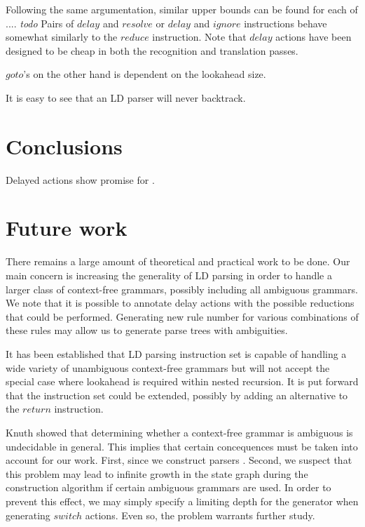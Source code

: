 \documentclass[a4paper,11pt]{article}
\begin{document}
Following the same argumentation, similar upper bounds can be found for each of .... \emph{todo}
Pairs of $delay$ and $resolve$ or $delay$ and $ignore$ instructions behave somewhat similarly to the $reduce$ instruction. 
Note that $delay$ actions have been designed to be cheap in both the recognition and translation passes. 

$goto$'s on the other hand is dependent on the lookahead size.


It is easy to see that an LD parser will never backtrack.


\section*{Conclusions}

Delayed actions show promise for .

\section*{Future work}

There remains a large amount of theoretical and practical work to be done.
Our main concern is increasing the generality of LD parsing in order to handle a larger class of context-free grammars, possibly including all ambiguous grammars. 
We note that it is possible to annotate delay actions with the possible reductions that could be performed. 
Generating new rule number for various combinations of these rules may allow us to generate parse trees with ambiguities.

It has been established that LD parsing instruction set is capable of handling a wide variety of unambiguous context-free grammars but will not accept the special case where lookahead is required within nested recursion.
It is put forward that the instruction set could be extended, possibly by adding an alternative to the $return$ instruction.

Knuth showed that determining whether a context-free grammar is ambiguous is undecidable in general\cite{knuth65}. 
This implies that certain concequences must be taken into account for our work. First, since we construct parsers .
Second, we suspect that this problem may lead to infinite growth in the state graph during the construction algorithm if certain ambiguous grammars are used.
In order to prevent this effect, we may simply specify a limiting depth for the generator when generating $switch$ actions.
Even so, the problem warrants further study.
\end{document}
